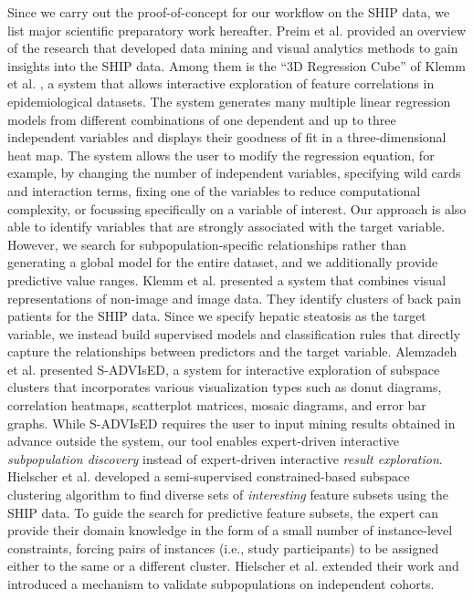 \documentclass[
  oneside]{book}
\begin{document}
Since we carry out the proof-of-concept for our workflow on the SHIP data, we list major scientific preparatory work hereafter.
Preim et al. \autocite{Preim:EurographicsMedPrice2019} provided an overview of the research that developed data mining and visual analytics methods to gain insights into the SHIP data.
Among them is the ``3D Regression Cube'' of Klemm et al. \autocite{Klemm:RegressionHeatmap2015}, a system that allows interactive exploration of feature correlations in epidemiological datasets.
The system generates many multiple linear regression models from different combinations of one dependent and up to three independent variables and displays their goodness of fit in a three-dimensional heat map.
The system allows the user to modify the regression equation, for example, by changing the number of independent variables, specifying wild cards and interaction terms, fixing one of the variables to reduce computational complexity, or focussing specifically on a variable of interest.
Our approach is also able to identify variables that are strongly associated with the target variable.
However, we search for subpopulation-specific relationships rather than generating a global model for the entire dataset, and we additionally provide predictive value ranges.
Klemm et al. \autocite{Klemm14} presented a system that combines visual representations of non-image and image data.
They identify clusters of back pain patients for the SHIP data.
Since we specify hepatic steatosis as the target variable, we instead build supervised models and classification rules that directly capture the relationships between predictors and the target variable.
Alemzadeh et al. \autocite{eurova.20171118} presented S-ADVIsED, a system for interactive exploration of subspace clusters that incorporates various visualization types such as donut diagrams, correlation heatmaps, scatterplot matrices, mosaic diagrams, and error bar graphs.
While S-ADVIsED requires the user to input mining results obtained in advance outside the system, our tool enables expert-driven interactive \emph{subpopulation discovery} instead of expert-driven interactive \emph{result exploration}.
Hielscher et al. \autocite{Hielscher16} developed a semi-supervised constrained-based subspace clustering algorithm to find diverse sets of \emph{interesting} feature subsets using the SHIP data.
To guide the search for predictive feature subsets, the expert can provide their domain knowledge in the form of a small number of instance-level constraints, forcing pairs of instances (i.e., study participants) to be assigned either to the same or a different cluster.
Hielscher et al. \autocite{Hielscher2018} extended their work and introduced a mechanism to validate subpopulations on independent cohorts.
\end{document}
